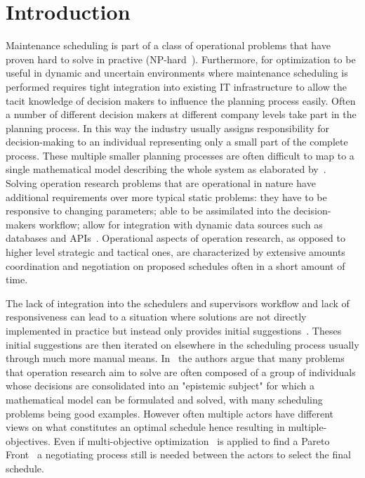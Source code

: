 \section{Introduction}
\label{sec:1-introduction}

Maintenance scheduling is part of a class of operational problems that have proven hard to solve in practive (NP-hard~\citep{garey1979computers}).
Furthermore, for optimization to be useful in dynamic and uncertain environments where maintenance scheduling 
is performed requires tight integration into existing IT infrastructure to allow the  tacit knowledge of decision makers to influence
the planning process easily. Often a number of different decision makers at different company levels take part in the
planning process. In this way the industry usually assigns responsibility for decision-making to an individual
representing only a small part of the complete process. These multiple smaller planning processes are often difficult
to map to a single mathematical model describing the whole system as elaborated by~\citep{barthelemy2002human}. Solving
operation research problems that are operational in nature have additional requirements over more typical static
problems: they have to be responsive to changing parameters; able to be assimilated into the decision-makers workflow;
allow for integration with dynamic data sources such as databases and APIs~\citep{meignan_review_2015}. Operational
aspects of operation research, as opposed to higher level strategic and tactical ones, are characterized by extensive
amounts coordination and negotiation on proposed schedules often in a short amount of time.

The lack of integration into the schedulers and supervisors workflow and lack of responsiveness can lead to a situation 
where solutions are not directly implemented in practice but instead only provides initial suggestions~\citep{meignan_review_2015}.
Theses initial suggestions are then iterated on elsewhere in the scheduling process usually through much more manual means. 
In~\citep{barthelemy2002human} the authors argue that many problems that operation research aim to solve are often composed
of a group of individuals whose decisions are consolidated into an "epistemic subject" for which a mathematical model can be formulated
and solved, with many scheduling problems being good examples. However often multiple actors have different
views on what constitutes an optimal schedule hence resulting in multiple-objectives. Even if multi-objective
optimization~\citep{ehrgott2002multiple} is applied to find a Pareto Front~\citep{Pareto1897} a negotiating process
still is needed between the actors to select the final schedule. 

